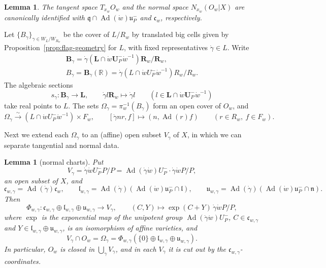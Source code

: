 \documentclass[a4paper,12pt]{amsart}
\numberwithin{equation}{section}
\newtheorem{lemma}[theorem]{Lemma}
\theoremstyle{definition}
\theoremstyle{remark}
\newcommand{\lL}{\mathbf L}
\newcommand{\U}{\mathbf U}
\newcommand{\B}{\mathbf B}
\newcommand{\R}{\mathbb R}
\newcommand{\fq}{\mathfrak q}
\newcommand{\fl}{\mathfrak l}
\newcommand{\fn}{\mathfrak n}
\newcommand{\fu}{\mathfrak u}
\newcommand{\fc}{\mathfrak c}
\newcommand{\Ad}{\operatorname{Ad}}
\newcommand{\rR}{\mathbf R}
\begin{document}
\begin{lemma}\label{lem:tangent-normal}
The tangent space $T_{x_w}O_w$ and the normal space $N_{x_w}(O_w|X)$ are canonically identified with $\fq\cap\Ad(\dot w)\mathfrak u_P^-$ and $\fc_w$, respectively.
\end{lemma}

Let $\{B_\gamma\}_{\gamma\in W_L/W_{R_w}}$ be the cover of $L/R_w$ by translated big cells given by Proposition~\ref{prop:flag-geometry} for $L$, with fixed representatives $\dot\gamma\in L$. Write
\[
\begin{gathered}
 \B_\gamma=\dot\gamma(\lL\cap\dot w\U_P^-\dot w^{-1})\rR_w/\rR_w,\\
 B_\gamma=\B_\gamma(\R)=\dot\gamma(L\cap\dot wU_P^-\dot w^{-1})R_w/R_w.
\end{gathered}
\]
The algebraic sections
\[
 s_\gamma:\B_\gamma\to\lL,\qquad\dot\gamma l\rR_w\mapsto\dot\gamma l\qquad(l\in\lL\cap\dot w\U_P^-\dot w^{-1})
\]
take real points to $L$.
The sets $\Omega_\gamma=\pi_w^{-1}(B_\gamma)$ form an open cover of $O_w$, and
\begin{equation}\label{eq:Omega-product}
 \Omega_\gamma\xrightarrow{\ \sim\ }(L\cap\dot wU_P^-\dot w^{-1})\times F_w,\qquad[\dot\gamma nr,f]\mapsto(n,\Ad(r)f)\qquad(r\in R_w,\ f\in F_w).
\end{equation}

Next we extend each $\Omega_\gamma$ to an (affine) open subset $V_\gamma$ of $X$, in which we can separate tangential and normal data.

\begin{lemma}[normal charts]\label{lem:normal-charts}
Put
\[
 V_\gamma=\dot\gamma\dot wU_P^-P/P=\Ad(\dot\gamma\dot w)U_P^-\cdot\dot\gamma\dot wP/P,
\]
an open subset of $X$, and
\[
 \fc_{w,\gamma}=\Ad(\dot\gamma)\fc_w,\qquad \fl_{w,\gamma}=\Ad(\dot\gamma)(\Ad(\dot w)\mathfrak u_P^-\cap\fl),\qquad \fu_{w,\gamma}=\Ad(\dot\gamma)(\Ad(\dot w)\mathfrak u_P^-\cap\fn).
\]
Then
\begin{equation}\label{eq:normal-chart}
 \Phi_{w,\gamma}:\fc_{w,\gamma}\oplus\fl_{w,\gamma}\oplus\fu_{w,\gamma}\to V_\gamma,\qquad(C,Y)\mapsto\exp(C+Y)\,\dot\gamma\dot wP/P,
\end{equation}
where $\exp$ is the exponential map of the unipotent group $\Ad(\dot\gamma\dot w)U_P^-$, $C\in\fc_{w,\gamma}$ and $Y\in\fl_{w,\gamma}\oplus\fu_{w,\gamma}$, is an isomorphism of affine varieties, and
\[
 V_\gamma\cap O_w=\Omega_\gamma=\Phi_{w,\gamma}(\{0\}\oplus\fl_{w,\gamma}\oplus\fu_{w,\gamma}).
\]
In particular, $O_w$ is closed in $\bigcup_\gamma V_\gamma$, and in each $V_\gamma$ it is cut out by the $\fc_{w,\gamma}$-coordinates.
\end{lemma}
\end{document}
